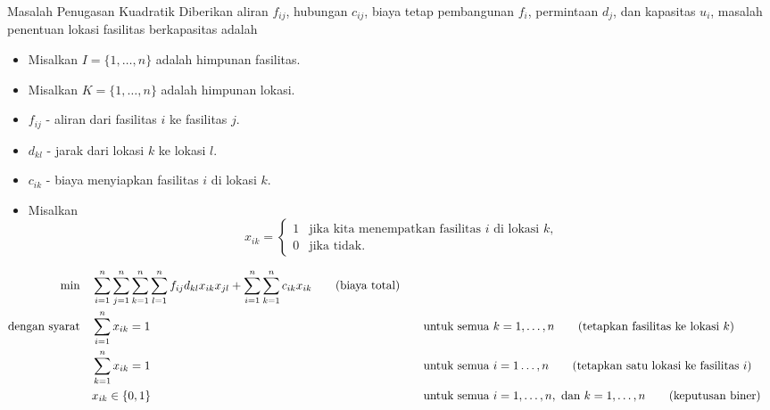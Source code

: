 \begin{general}{Masalah Penugasan Kuadratik}{\npcomplete}
Diberikan aliran $f_{ij}$, hubungan $c_{ij}$, biaya tetap pembangunan $f_i$, permintaan $d_j$, dan kapasitas $u_i$, masalah penentuan lokasi fasilitas berkapasitas adalah

\begin{itemize}
\item Misalkan $I = \{1,\dots, n\}$ adalah himpunan fasilitas.
\item Misalkan $K = \{1, \dots, n\}$ adalah himpunan lokasi.
\end{itemize}

\begin{itemize}
\item $f_{ij}$ - aliran dari fasilitas $i$ ke fasilitas $j$.
\item $d_{kl}$ - jarak dari lokasi $k$ ke lokasi $l$.
\item $c_{ik}$ - biaya menyiapkan fasilitas $i$ di lokasi $k$.
\end{itemize}

\begin{itemize}
\item Misalkan
\begin{equation*}
x_{ik} = \begin{cases}
1 & \text{jika kita menempatkan fasilitas $i$ di lokasi $k$,}\\
0 & \text{jika tidak.}
\end{cases}
\end{equation*}
\end{itemize}

\begin{align}
\min \quad & \displaystyle\sum_{i=1}^n\sum_{j=1}^n \sum_{k=1}^n \sum_{l = 1}^n f_{ij}d_{kl}x_{ik}x_{jl} + \sum_{i=1}^n \sum_{k = 1}^n c_{ik} x_{ik}   \tag{biaya total} \\
\mbox{dengan syarat}\quad        & \displaystyle\sum_{i=1}^n x_{ik}=1 &&\quad \mbox{untuk semua } k=1,\dots,n   \tag{tetapkan fasilitas ke lokasi $k$} \\
& \displaystyle \sum_{k=1}^n x_{ik}=1 &&\quad \mbox{untuk semua } i=1\dots,n   \tag{tetapkan satu lokasi ke fasilitas $i$} \\
& x_{ik}\in\{0,1\} &&\quad \mbox{untuk semua } i=1,\dots,n, \mbox{ dan } k = 1, \dots, n   \tag{keputusan biner}
\end{align}
\end{general}

